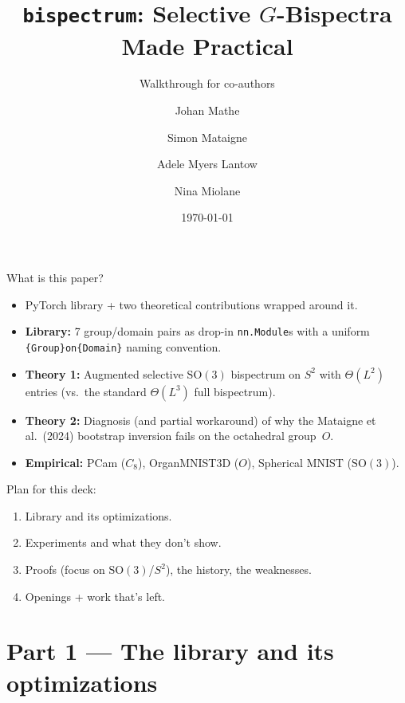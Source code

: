 \documentclass[10pt,aspectratio=169]{beamer}
\title{\texttt{bispectrum}: Selective $G$-Bispectra Made Practical}
\subtitle{Walkthrough for co-authors}
\author{Johan Mathe \and Simon Mataigne \and Adele Myers Lantow \and Nina Miolane}
\date{\today}
\newcommand{\SO}{\mathrm{SO}}
\begin{document}
\maketitle

\begin{frame}{What is this paper?}
\begin{itemize}
  \item PyTorch library + two theoretical contributions wrapped around it.
  \item \textbf{Library:} 7 group/domain pairs as drop-in \texttt{nn.Module}s with
        a uniform \texttt{\{Group\}on\{Domain\}} naming convention.
  \item \textbf{Theory 1:} Augmented selective $\SO(3)$ bispectrum on $S^2$ with
        $\Theta(L^2)$ entries (vs.\ the standard $\Theta(L^3)$ full bispectrum).
  \item \textbf{Theory 2:} Diagnosis (and partial workaround) of why the
        Mataigne et al.\ (2024) bootstrap inversion fails on the
        octahedral group~$O$.
  \item \textbf{Empirical:} PCam ($C_8$), OrganMNIST3D ($O$), Spherical MNIST ($\SO(3)$).
\end{itemize}
\vspace{0.4em}
Plan for this deck:
\begin{enumerate}
  \item Library and its optimizations.
  \item Experiments and what they don't show.
  \item Proofs (focus on $\SO(3)$/$S^2$), the history, the weaknesses.
  \item Openings + work that's left.
\end{enumerate}
\end{frame}

\section{Part 1 --- The library and its optimizations}
\end{document}
